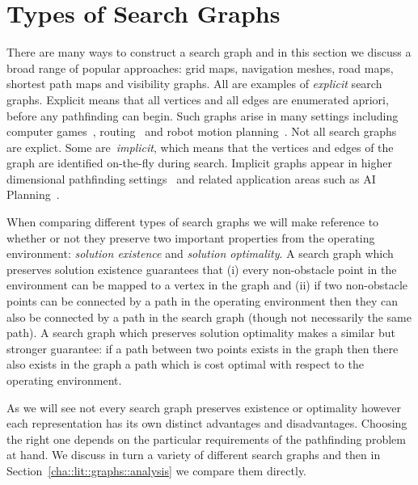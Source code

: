 \section{Types of Search Graphs}
\label{cha::lit::graphs}


There are many ways to construct a search graph and in this section we discuss 
a broad range of popular approaches: grid maps, navigation meshes, road
maps, shortest path maps and visibility graphs.  All are examples of
\emph{explicit} search graphs.  Explicit means that all vertices and all edges
are enumerated apriori, before any pathfinding can begin.  Such graphs arise in
many settings including computer games~\citep{davis00,tozour02,champandard09},
routing~\citep{sanders05,goldberg06} and robot motion
planning~\citep{latombe91,choset05}.  Not all search graphs are explict.  Some
are~\emph{implicit}, which means that the vertices and edges of the graph are
identified on-the-fly during search.  Implicit graphs appear in higher
dimensional pathfinding settings~\citep{lavalle98,bohlin00} and related
application areas such as AI Planning~\citep{russel03}.

When comparing different types of search graphs we will make reference to
whether or not they preserve two important properties from the operating
environment: \emph{solution existence} and \emph{solution optimality}.  A search
graph which preserves solution existence guarantees that (i) every non-obstacle
point in the environment can be mapped to a vertex in the graph and (ii) if two
non-obstacle points can be connected by a path in the operating environment then
they can also be connected by a path in the search graph (though not necessarily
the same path).  A search graph which preserves solution optimality makes a similar 
but stronger guarantee: if a path between two points exists in the graph then there
also exists in the graph a path which is cost optimal with respect to the
operating environment.


As we will see not every search graph preserves existence or optimality however
each representation has its own distinct advantages and disadvantages. Choosing the
right one depends on the particular requirements of the pathfinding problem at
hand. We discuss in turn a variety of different search graphs and then in
Section~\ref{cha::lit::graphs::analysis} we compare them directly.

